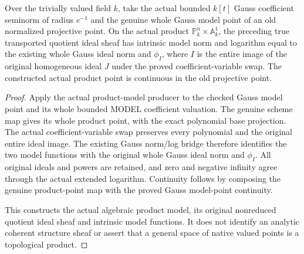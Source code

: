 \begin{theorem}
\label{projective:paper-gauss-actual-product-model-log}
\leanok
{}
Over the trivially valued field $k$, take the actual bounded $k[t]$ Gauss
coefficient seminorm of radius $e^{-1}$ and the genuine whole Gauss model
point of an old normalized projective point. On the actual product
$\mathbb P^n_k\times\mathbb A^1_k$, the preceding true transported quotient
ideal sheaf has intrinsic model norm and logarithm equal to the existing
whole Gauss ideal norm and $\phi_I$, where $I$ is the entire image of the
original homogeneous ideal $J$ under the proved coefficient-variable swap.
The constructed actual product point is continuous in the old projective
point.
\end{theorem}
\begin{proof}
Apply the actual product-model producer to the checked Gauss
model point and its whole bounded MODEL coefficient valuation. The genuine
scheme map gives its whole product point, with the exact polynomial base
projection. The actual coefficient-variable swap preserves every polynomial
and the original entire ideal image. The existing Gauss norm/log bridge
therefore identifies the two model functions with the original whole Gauss
ideal norm and $\phi_I$. All original ideals and powers are retained, and
zero and negative infinity agree through the actual extended logarithm.
Continuity follows by composing the genuine product-point map with the
proved Gauss model-point continuity.

This constructs the actual algebraic product model, its original nonreduced
quotient ideal sheaf and intrinsic model functions. It does not identify an
analytic coherent structure sheaf or assert that a general space of native
valued points is a topological product.
\end{proof}
